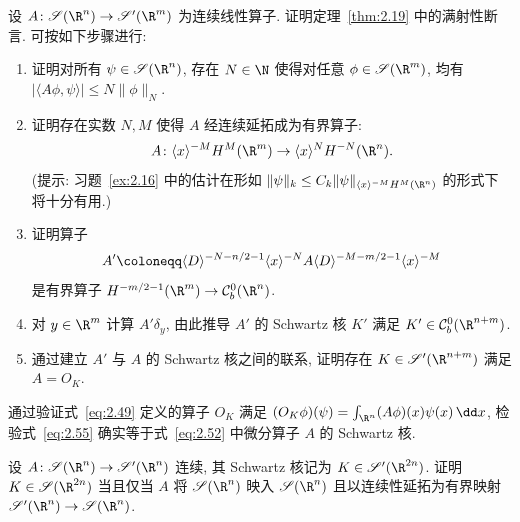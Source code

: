 \begin{exer}\label{ex:2.18}
设 $A \colon \Schwartz(\R^n) \to \TempDistr(\R^m)$ 为连续线性算子. 证明定理~\ref{thm:2.19} 中的满射性断言. 可按如下步骤进行:
\begin{enumerate}
    \item 证明对所有 $\psi \in \Schwartz(\R^n)$, 存在 $N \in \N$ 使得对任意 $\phi \in \Schwartz(\R^m)$, 均有 $|\langle A \phi, \psi \rangle| \le N \|\phi\|_N$.
    \item 证明存在实数 $N, M$ 使得 $A$ 经连续延拓成为有界算子:
    \begin{equation}\label{eq:2.83}
        A \colon \langle x \rangle^{-M} H^M(\R^m) \to \langle x \rangle^N H^{-N}(\R^n).
    \end{equation}
    (提示: 习题~\ref{ex:2.16} 中的估计在形如 $\|\psi\|_k \le C_k \|\psi\|_{\langle x \rangle^{-M} H^M(\R^n)}$ 的形式下将十分有用.)
    \item 证明算子
    \begin{equation}\label{eq:2.84}
        A' \defeq \langle D \rangle^{-N - n/2 - 1} \langle x \rangle^{-N} A \langle D \rangle^{-M - m/2 - 1} \langle x \rangle^{-M}
    \end{equation}
    是有界算子 $H^{-m/2 - 1}(\R^m) \to \mathcal{C}_b^0(\R^n)$.
    \item 对 $y \in \R^m$ 计算 $A' \delta_y$, 由此推导 $A'$ 的 Schwartz 核 $K'$ 满足 $K' \in \mathcal{C}_b^0(\R^{n+m})$.
    \item 通过建立 $A'$ 与 $A$ 的 Schwartz 核之间的联系, 证明存在 $K \in \TempDistr(\R^{n+m})$ 满足 $A = O_K$.
\end{enumerate}
\end{exer}

\begin{exer}\label{ex:2.19}
通过验证式~\eqref{eq:2.49} 定义的算子 $O_K$ 满足 $(O_K \phi)(\psi) = \int_{\R^n} (A \phi)(x) \psi(x) \,\dd x$, 检验式~\eqref{eq:2.55} 确实等于式~\eqref{eq:2.52} 中微分算子 $A$ 的 Schwartz 核.
\end{exer}

\begin{exer}\label{ex:2.20}
设 $A \colon \Schwartz(\R^n) \to \TempDistr(\R^n)$ 连续, 其 Schwartz 核记为 $K \in \TempDistr(\R^{2n})$. 证明 $K \in \Schwartz(\R^{2n})$ 当且仅当 $A$ 将 $\Schwartz(\R^n)$ 映入 $\Schwartz(\R^n)$ 且以连续性延拓为有界映射 $\TempDistr(\R^n) \to \Schwartz(\R^n)$.
\end{exer}

